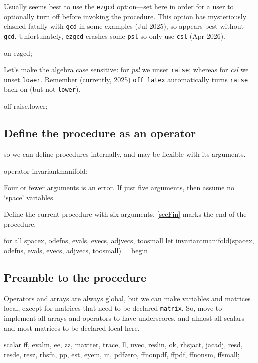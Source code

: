 \documentclass[11pt,a5paper]{article}
\begin{document}
Usually seems best to use the \verb|ezgcd| option---set here
in order for a user to optionally turn off before invoking
the procedure.  This option has mysteriously clashed fatally
with \verb|gcd| in some examples (Jul 2025), so appears best
without \verb|gcd|.  Unfortunately, \verb|ezgcd| crashes 
some \verb|psl| so only use \verb|csl| (Apr 2026).
\begin{reduce}
on ezgcd; 
\end{reduce}
Let's make the algebra case sensitive: for \emph{psl} we unset \verb|raise|; whereas for \emph{csl} we unset \verb|lower|.  
Remember (currently, 2025) \verb|off latex| automatically turns \verb|raise| back on (but not \verb|lower|).
\begin{reduce}
off raise,lower;
\end{reduce}



\subsection{Define the procedure as an operator} so we can define
procedures internally, and may be flexible with its
arguments. 
\begin{reduce}
operator invariantmanifold;
\end{reduce}
Four or fewer arguments is an error.
If just five arguments, then assume no `space' variables.

Define the current procedure with six arguments. 
\eqref{secFin} marks the end of the procedure.
\begin{reduce}
for all spacex, odefns, evals, evecs, adjvecs, toosmall 
    let invariantmanifold(spacex, odefns, evals, evecs, 
        adjvecs, toosmall) = begin 
\end{reduce}


\subsection{Preamble to the procedure}
Operators and arrays are always global, but we can make
variables and matrices local, except for matrices that need
to be declared \verb|matrix|.  So, move to implement all
arrays and operators to have underscores, and almost all
scalars and most matrices to be declared local here.
\begin{reduce}
scalar ff, evalm, ee, zz, maxiter, trace, ll, uvec,
reslin, ok, rhsjact, jacadj, resd, resde, resz, rhsfn,
pp, est, eyem, m, pdfzero, ffnonpdf, ffpdf, ffnonsm,
ffsmall;
\end{reduce}
\end{document}
